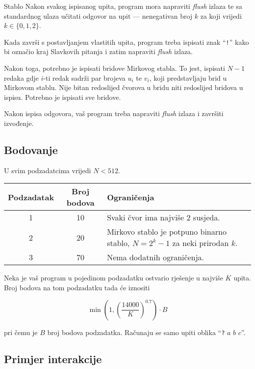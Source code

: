 \begin{statement}[
  problempoints=100,
  timelimit=3 sekundi,
  memorylimit=512 MiB,
]{Stablo}
Nakon svakog ispisanog upita, program mora napraviti \textit{flush} izlaza te sa standardnog ulaza učitati odgovor na upit — nenegativan broj $k$ za koji vrijedi $k \in \{0, 1, 2\}$.

Kada završi s postavljanjem vlastitih upita, program treba ispisati znak ``\texttt{!}'' kako bi označio kraj Slavkovih pitanja i zatim napraviti \textit{flush} izlaza.

Nakon toga, potrebno je ispisati bridove Mirkovog stabla. To jest, ispisati $N - 1$ redaka gdje $i$-ti redak sadrži par brojeva $u_i$ te $v_i$, koji predstavljaju brid u Mirkovom stablu. Nije bitan redoslijed čvorova u bridu niti redoslijed bridova u ispisu. Potrebno je ispisati sve bridove.

Nakon ispisa odgovora, vaš program treba napraviti \textit{flush} izlaza i završiti izvođenje.

\subsection*{Bodovanje}

U svim podzadatcima vrijedi $N < 512$.

{\renewcommand{\arraystretch}{1.4}
  \setlength{\tabcolsep}{6pt}
  \begin{tabular}{ccl}
   Podzadatak & Broj bodova & Ograničenja \\ \midrule
   	1 & 10 & Svaki čvor ima najviše $2$ susjeda. \\
    2 & 20 & Mirkovo stablo je potpuno binarno stablo, $N = 2^k-1$ za neki prirodan $k$. \\
    3 & 70 & Nema dodatnih ograničenja. \\
\end{tabular}}

Neka je vaš program u pojedinom podzadatku ostvario rješenje u najviše $K$ upita. Broj bodova na tom podzadatku tada će iznositi

\[
\min\left(1, \left(\frac{14000}{K}\right)^{0.7}\right) \cdot B
\]

pri čemu je $B$ broj bodova podzadatka. Računaju se samo upiti oblika ``\texttt{?} $a$ $b$ $c$''.

\subsection*{Primjer interakcije}


\end{statement}

